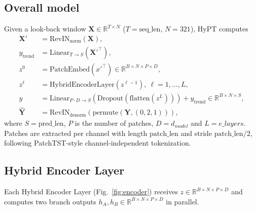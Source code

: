 \documentclass[10pt,journal]{IEEEtran}
\begin{document}
\subsection{Overall model}
Given a look-back window $\bm{X}\in\mathbb{R}^{T\times N}$ ($T=\mathrm{seq\_len}$, $N=321$), HyPT computes
\begin{align}
\bm{X'} &= \mathrm{RevIN}_{\mathrm{norm}}(\bm{X}), \\
y_{\mathrm{trend}} &= \mathrm{Linear}_{T\rightarrow S}(\bm{X'}^{\top}), \\
z^0 &= \mathrm{PatchEmbed}({x'}^{\top}) \in \mathbb{R}^{B\times N \times P \times D}, \\
z^{\ell} &= \mathrm{HybridEncoderLayer}(z^{\ell-1}),\ \ell=1,\dots,L, \\
y &= \mathrm{Linear}_{P\cdot D \rightarrow S}(\mathrm{Dropout}(\mathrm{flatten}(z^{L}))) + y_{\mathrm{trend}} \in \mathbb{R}^{B \times N \times S}, \\
\bm{\hat{Y}} &= \mathrm{RevIN}_{\mathrm{denorm}}(\mathrm{permute}(\bm{Y}, (0, 2, 1))),
\end{align}
where $S=\mathrm{pred\_len}$, $P$ is the number of patches, $D=d_{model}$ and $L=e\_layers$. Patches are extracted per channel with length $\mathrm{patch\_len}$ and stride $\mathrm{patch\_len}/2$, following PatchTST-style channel-independent tokenization.

\subsection{Hybrid Encoder Layer}
Each Hybrid Encoder Layer (Fig.~\ref{fig:encoder}) receives $z\in\mathbb{R}^{B\times N\times P\times D}$ and computes two branch outputs $h_A, h_B \in \mathbb{R}^{B\times N\times P\times D}$ in parallel.
\end{document}
